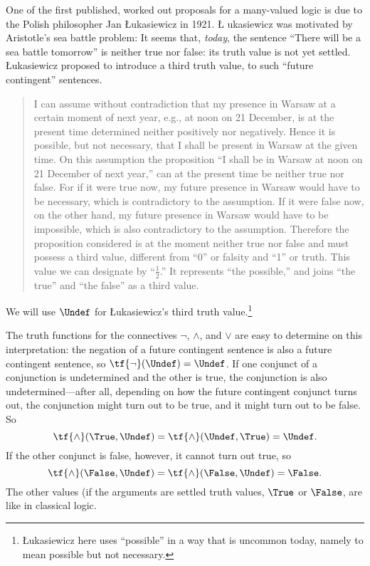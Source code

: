 \documentclass[../../../include/open-logic-section]{subfiles}
\begin{document}


One of the first published, worked out proposals for a many-valued
logic is due to the Polish philosopher Jan \L ukasiewicz in 1921.  \L
ukasiewicz was motivated by Aristotle's sea battle problem: It seems
that, \emph{today}, the sentence ``There will be a sea battle
tomorrow'' is neither true nor false: its truth value is not yet
settled.  \L ukasiewicz proposed to introduce a third truth value,
to such ``future contingent'' sentences.
\begin{quote}
I can assume without contradiction that my presence in Warsaw at a
certain moment of next year, e.g., at noon on 21 December, is at the
present time determined neither positively nor negatively. Hence it is
possible, but not necessary, that I shall be present in Warsaw at the
given time. On this assumption the proposition ``I shall be in Warsaw
at noon on 21 December of next year,'' can at the present time be
neither true nor false. For if it were true now, my future presence in
Warsaw would have to be necessary, which is contradictory to the
assumption. If it were false now, on the other hand, my future
presence in Warsaw would have to be impossible, which is also
contradictory to the assumption. Therefore the proposition considered
is at the moment neither true nor false and must possess a third
value, different from ``0'' or falsity and ``1'' or truth. This value
we can designate by ``$\frac{1}{2}$.'' It represents ``the possible,''
and joins ``the true'' and ``the false'' as a third value.
\end{quote}
We will use $\Undef$ for \L ukasiewicz's third truth
value.\footnote{\L ukasiewicz here uses ``possible'' in a way that is
uncommon today, namely to mean possible but not necessary.}

The truth functions for the connectives $\lnot$, $\land$, and $\lor$
are easy to determine on this interpretation: the negation of a future
contingent sentence is also a future contingent sentence, so
$\tf{\lnot}(\Undef) = \Undef$.  If one conjunct of a
conjunction is undetermined and the other is true, the conjunction is
also undetermined---after all, depending on how the future contingent
conjunct turns out, the conjunction might turn out to be true, and it
might turn out to be false. So \[
    \tf{\land}(\True, \Undef) =
\tf{\land}(\Undef, \True) =
\Undef.
\]
If the other conjunct is false, however, it cannot
turn out true, so \[\tf{\land}(\False, \Undef) =
\tf{\land}(\False, \Undef) = \False.\]
The other values (if the arguments are settled truth values, $\True$
or $\False$, are like in classical logic.
\end{document}
